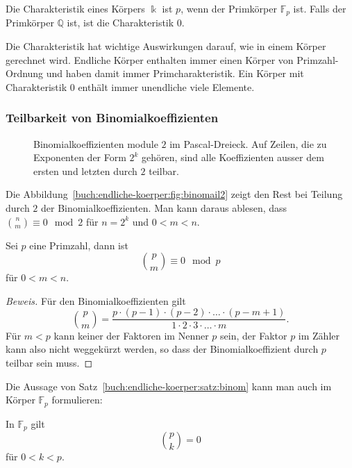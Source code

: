 \begin{definition}
Die Charakteristik eines Körpers $\Bbbk$ ist $p$, wenn der Primkörper
$\mathbb{F}_p$ ist.
Falls der Primkörper $\mathbb{Q}$ ist, ist die Charakteristik $0$.
\end{definition}

Die Charakteristik hat wichtige Auswirkungen darauf, wie in einem Körper
gerechnet wird.
Endliche Körper enthalten immer einen Körper von Primzahl-Ordnung und
haben damit immer Primcharakteristik.
Ein Körper mit Charakteristik $0$ enthält immer unendliche viele
Elemente.

\subsubsection{Teilbarkeit von Binomialkoeffizienten}
\begin{figure}
\centering
\caption{Binomialkoeffizienten module $2$ im Pascal-Dreieck.
Auf Zeilen, die zu Exponenten der Form $2^k$ gehören, sind alle 
Koeffizienten ausser dem ersten und letzten durch $2$ teilbar.
\label{buch:endliche-koerper:fig:binomial2}}
\end{figure}
Die Abbildung~\ref{buch:endliche-koerper:fig:binomail2} zeigt den
Rest bei Teilung durch $2$ der Binomialkoeffizienten.
Man kann daraus ablesen, dass $\binom{n}{m}\equiv 0\mod 2$ für $n=2^k$ 
und $0<m<n$.

\begin{satz}
\label{buch:endliche-koerper:satz:binom}
Sei $p$ eine Primzahl, dann ist
\[
\binom{p}{m} \equiv 0\mod p
\]
für $0<m<n$.
\end{satz}

\begin{proof}[Beweis]
Für den Binomialkoeffizienten gilt
\[
\binom{p}{m}
=
\frac{p\cdot (p-1)\cdot(p-2)\cdot\ldots\cdot (p-m+1)}{1\cdot 2\cdot 3\cdot\ldots\cdot m}.
\]
Für $m<p$ kann keiner der Faktoren im Nenner $p$ sein, der Faktor $p$
im Zähler kann also nicht weggekürzt werden, so dass der Binomialkoeffizient
durch $p$ teilbar sein muss.
\end{proof}

Die Aussage von Satz~\ref{buch:endliche-koerper:satz:binom} kann man 
auch im Körper $\mathbb{F}_p$ formulieren:

\begin{satz}
\label{buch:endliche-koerper:satz:binomFp}
In $\mathbb{F}_p$ gilt
\[
\binom{p}{k}=0
\]
für $0<k<p$.
\end{satz}

